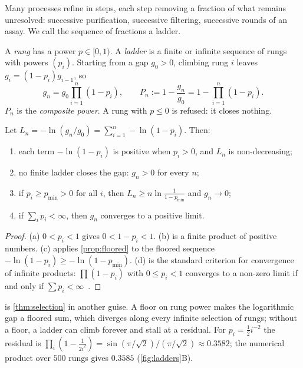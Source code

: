 \documentclass[10pt,twocolumn,a4paper]{article}
\begin{document}
Many processes refine in steps, each step removing a fraction of what
remains unresolved: successive purification, successive filtering, successive
rounds of an assay. We call the sequence of fractions a ladder.

\begin{definition}
\label{def:ladder}
A \emph{rung} has a power $p\in[0,1)$. A \emph{ladder} is a finite or
infinite sequence of rungs with powers $(p_i)$. Starting from a gap
$g_0>0$, climbing rung $i$ leaves $g_i=(1-p_i)g_{i-1}$, so
\begin{equation}
g_n=g_0\prod_{i=1}^{n}(1-p_i),\qquad
P_n:=1-\frac{g_n}{g_0}=1-\prod_{i=1}^{n}(1-p_i).
\label{eq:ladder}
\end{equation}
$P_n$ is the \emph{composite power}. A rung with $p\le0$ is refused: it
closes nothing.
\end{definition}

\begin{theorem}
\label{thm:ladder}
Let $L_n=-\ln(g_n/g_0)=\sum_{i=1}^n-\ln(1-p_i)$. Then:
\begin{enumerate}[label=(\alph*),nosep]
\item each term $-\ln(1-p_i)$ is positive when $p_i>0$, and $L_n$ is
      non-decreasing;
\item no finite ladder closes the gap: $g_n>0$ for every $n$;
\item if $p_i\ge p_{\min}>0$ for all $i$, then $L_n\ge n\ln\frac{1}{1-p_{\min}}$
      and $g_n\to0$;
\item if $\sum_i p_i<\infty$, then $g_n$ converges to a positive limit.
\end{enumerate}
\end{theorem}

\begin{proof}
(a) $0<p_i<1$ gives $0<1-p_i<1$. (b) is a finite product of positive
numbers. (c) applies \cref{prop:floored} to the floored sequence
$-\ln(1-p_i)\ge-\ln(1-p_{\min})$. (d) is the standard criterion for
convergence of infinite products: $\prod(1-p_i)$ with $0\le p_i<1$ converges
to a non-zero limit if and only if $\sum p_i<\infty$~\citep{knopp1990}.
\end{proof}

 is \cref{thm:selection} in another guise. A floor on rung
power makes the logarithmic gap a floored sum, which diverges along every
infinite selection of rungs; without a floor, a ladder can climb forever and
stall at a residual. For $p_i=\tfrac12 i^{-2}$ the residual is
$\prod_i(1-\tfrac{1}{2i^2})=\sin(\pi/\sqrt2)/(\pi/\sqrt2)\approx0.3582$; the
numerical product over $500$ rungs gives $0.3585$ (\cref{fig:ladders}B).
\end{document}
